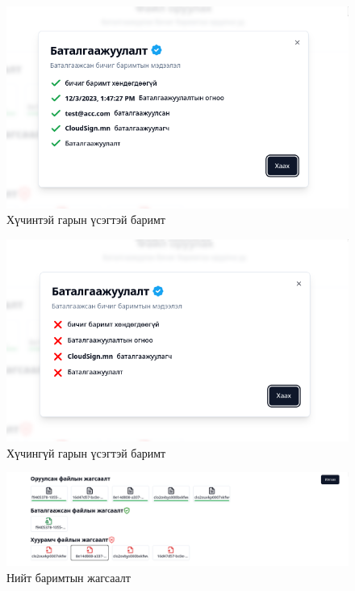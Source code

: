 \begin{figure}[h]
	\centering
	\includegraphics[scale=0.55]{assets/web/batalgaajuulaltConfirmed.png}
	\caption{Хүчинтэй гарын үсэгтэй баримт}
	\label{fig:architecture}
\end{figure}
\begin{figure}[h]
	\centering
	\includegraphics[scale=0.55]{assets/web/batalgaajuulaltDeclined.png}
	\caption{Хүчингүй гарын үсэгтэй баримт}
	\label{fig:architecture}
\end{figure}
\begin{figure}[h]
	\centering
	\includegraphics[scale=0.5]{assets/web/list.png}
	\caption{Нийт баримтын жагсаалт}
	\label{fig:architecture}
\end{figure}
